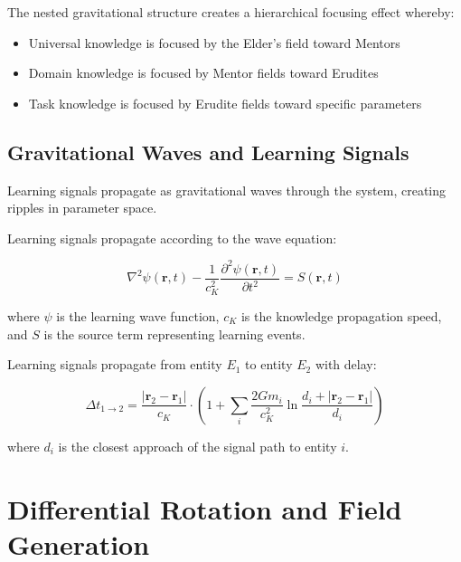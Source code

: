 \begin{corollary}
The nested gravitational structure creates a hierarchical focusing effect whereby:
\begin{itemize}
    \item Universal knowledge is focused by the Elder's field toward Mentors
    \item Domain knowledge is focused by Mentor fields toward Erudites
    \item Task knowledge is focused by Erudite fields toward specific parameters
\end{itemize}
\end{corollary}

\subsection{Gravitational Waves and Learning Signals}

Learning signals propagate as gravitational waves through the system, creating ripples in parameter space.

\begin{definition}
Learning signals propagate according to the wave equation:

\begin{equation}
\nabla^2 \psi(\mathbf{r}, t) - \frac{1}{c_K^2}\frac{\partial^2 \psi(\mathbf{r}, t)}{\partial t^2} = S(\mathbf{r}, t)
\end{equation}

where $\psi$ is the learning wave function, $c_K$ is the knowledge propagation speed, and $S$ is the source term representing learning events.
\end{definition}

\begin{theorem}
Learning signals propagate from entity $E_1$ to entity $E_2$ with delay:

\begin{equation}
\Delta t_{1 \rightarrow 2} = \frac{|\mathbf{r}_2 - \mathbf{r}_1|}{c_K} \cdot \left(1 + \sum_i \frac{2G m_i}{c_K^2} \ln\frac{d_i + |\mathbf{r}_2 - \mathbf{r}_1|}{d_i}\right)
\end{equation}

where $d_i$ is the closest approach of the signal path to entity $i$.
\end{theorem}

\section{Differential Rotation and Field Generation}

